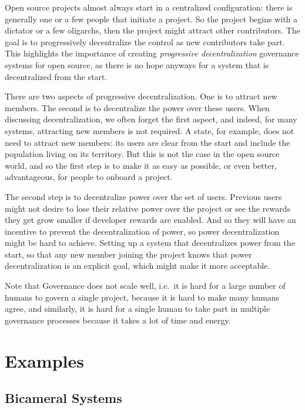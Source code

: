 Open source projects almost always start in a centralized configuration: there is generally one or a few people that initiate a project.
So the project begins with a dictator or a few oligarchs, then the project might attract other contributors.
The goal is to progressively decentralize the control as new contributors take part.
This highlights the importance of creating \emph{progressive decentralization} governance systems for open source, as there is no hope anyways for a system that is decentralized from the start.

There are two aspects of progressive decentralization.
One is to attract new members.
The second is to decentralize the power over these users.
When discussing decentralization, we often forget the first aspect, and indeed, for many systems, attracting new members is not required.
A state, for example, does not need to attract new members: its users are clear from the start and include the population living on its territory.
But this is not the case in the open source world, and so the first step is to make it as easy as possible, or even better, advantageous, for people to onboard a project.

The second step is to decentralize power over the set of users.
Previous users might not desire to lose their relative power over the project or see the rewards they get grow smaller if developer rewards are enabled.
And so they will have an incentive to prevent the decentralization of power, so power decentralization might be hard to achieve.
Setting up a system that decentralizes power from the start, so that any new member joining the project knows that power decentralization is an explicit goal, which might make it more acceptable.

Note that Governance does not scale well, i.e.\ it is hard for a large number of humans to govern a single project, because it is hard to make many humans agree, and similarly, it is hard for a single human to take part in multiple governance processes because it takes a lot of time and energy.

\section{Examples}

\subsection{Bicameral Systems}
\label{sec:bicameral_systems}

